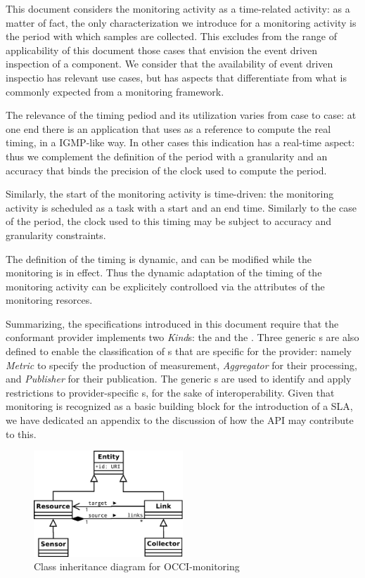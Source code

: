 \documentclass[10pt]{article}  %
\begin{document}
This document considers the monitoring activity as a time-related activity: as a matter of fact, the only characterization we introduce for a monitoring activity is the period with which samples are collected. This excludes from the range of applicability of this document those cases that envision the event driven inspection of a component. We consider that the availability of event driven inspectio has relevant use cases, but has aspects that differentiate from what is commonly expected from a monitoring framework.

The relevance of the timing pediod and its utilization varies from case to case: at one end there is an application that uses as a reference to compute the real timing, in a IGMP-like way. In other cases this indication has a real-time aspect: thus we complement the definition of the period with a granularity and an accuracy that binds the precision of the clock used to compute the period.

Similarly, the start of the monitoring activity is time-driven: the monitoring activity is scheduled as a task with a start and an end time. Similarly to the case of the period, the clock used to this timing may be subject to accuracy and granularity constraints.

The definition of the timing is dynamic, and can be modified while the monitoring is in effect. Thus the dynamic adaptation of the timing of the monitoring activity can be explicitely controlloed via the attributes of the monitoring resorces.   

Summarizing, the specifications introduced in this document require that the conformant provider implements two {\em Kind}s: the {\em \coll } and the {\em \sens }. Three generic \mi s are also defined to enable the classification of \mi s that are specific for the provider: namely {\em Metric} to specify the production of measurement, {\em Aggregator} for their processing, and {\em Publisher} for their publication. The generic \mi s are used to identify and apply restrictions to provider-specific \mi s, for the sake of interoperability.  Given that monitoring is recognized as a basic building block for the introduction of a SLA, we have dedicated an appendix to the discussion of how the API may contribute to this.

\begin{figure}
\centering
\includegraphics[width=0.5\textwidth]{img/Monitoring_UML.pdf}
\caption{Class inheritance diagram for OCCI-monitoring}
\end{figure}
\end{document}
